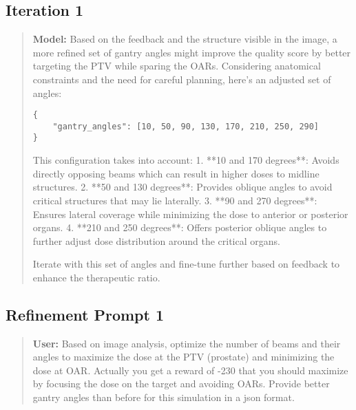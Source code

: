 \documentclass[runningheads]{llncs}
\begin{document}
\subsection*{Iteration 1}
\begin{quote}
\textbf{Model:} Based on the feedback and the structure visible in the image, a more refined set of gantry angles might improve the quality score by better targeting the PTV while sparing the OARs. Considering anatomical constraints and the need for careful planning, here's an adjusted set of angles:

\begin{verbatim}
{
    "gantry_angles": [10, 50, 90, 130, 170, 210, 250, 290]
}
\end{verbatim}

This configuration takes into account:
1. **10 and 170 degrees**: Avoids directly opposing beams which can result in higher doses to midline structures.
2. **50 and 130 degrees**: Provides oblique angles to avoid critical structures that may lie laterally.
3. **90 and 270 degrees**: Ensures lateral coverage while minimizing the dose to anterior or posterior organs.
4. **210 and 250 degrees**: Offers posterior oblique angles to further adjust dose distribution around the critical organs.

Iterate with this set of angles and fine-tune further based on feedback to enhance the therapeutic ratio.
\end{quote}

\subsection*{Refinement Prompt 1}
\begin{quote}
\textbf{User:} Based on image analysis, optimize the number of beams and their angles to maximize the dose at the PTV (prostate) and minimizing the dose at OAR. Actually you get a reward of -230 that you should maximize by focusing the dose on the target and avoiding OARs. Provide better gantry angles than before for this simulation in a json format.
\end{quote}
\end{document}
